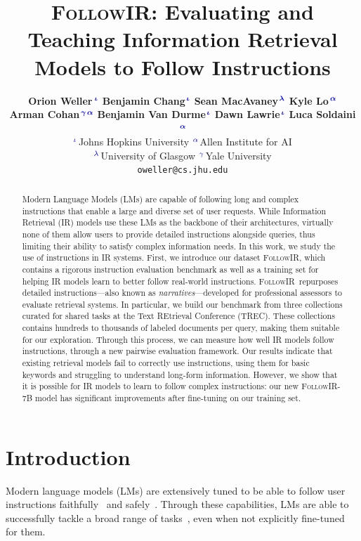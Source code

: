\documentclass{article} %
\author{
    \textbf{Orion Weller}$^{\hspace{.1em}
    \hspace{.1em}{\color{blue}\boldsymbol{\iota}}}$
    \quad
    \textbf{Benjamin Chang}$^{\hspace{.1em}\color{blue}\boldsymbol{\iota}}$
    \quad
    \textbf{Sean MacAvaney}$^{\hspace{.1em}\color{blue}\boldsymbol{\lambda}}$
    \quad
    \vspace{.2em}
    \textbf{Kyle Lo}$^{\hspace{.1em}\color{blue}\boldsymbol{\alpha}}$
    \quad \\
    \textbf{Arman Cohan}$^{\hspace{.1em}\color{blue}\boldsymbol{\gamma\hspace{.1em}\alpha}}$
    \quad
    \textbf{Benjamin Van Durme}$^{\hspace{.1em}\color{blue}\boldsymbol{\iota}}$
    \quad
    \textbf{Dawn Lawrie}$^{\hspace{.1em}\color{blue}\boldsymbol{\iota}}$
    \quad
    \textbf{Luca Soldaini}$^{\hspace{.1em}\color{blue}\boldsymbol{\alpha}}$
    \vspace{.5em}\\
    $^{\color{blue}\iota\hspace{.1em}}$Johns Hopkins University
    \quad
    $^{\color{blue}\alpha\hspace{.1em}}$Allen Institute for AI
     \vspace{.5em}\\
    $^{\color{blue}\lambda\hspace{.1em}}$University of Glasgow
        \quad
    $^{\color{blue}\gamma\hspace{.1em}}$Yale University
    \vspace{.5em}\\
    \texttt{oweller@cs.jhu.edu}
}
\begin{document}
\newcommand{\dataset}{\textsc{FollowIR}}

\title{\dataset: Evaluating and Teaching Information Retrieval Models to Follow Instructions}
\maketitle




\begin{abstract}
Modern Language Models (LMs) are capable of following long and complex instructions that enable 
a large and diverse set of user requests.
While Information Retrieval (IR) models use these LMs as the backbone of their architectures, 
virtually none of them allow users to provide detailed instructions alongside queries, thus limiting their ability to satisfy complex information needs.
In this work, we study the use of instructions in IR systems. 
First, we introduce our dataset \dataset, which contains a rigorous instruction evaluation benchmark as well as a training set for helping IR models learn to better follow real-world instructions.
\dataset\ repurposes detailed instructions---also known as \textit{narratives}---developed for professional assessors to evaluate retrieval systems.
In particular, we build our benchmark from three collections curated for  shared tasks at the Text REtrieval Conference (TREC).
These collections contains hundreds to thousands of labeled documents per query, making them suitable for our exploration.
Through this process, we can measure how well IR models follow instructions, through a new pairwise evaluation framework.
Our results indicate that existing retrieval models fail to correctly use instructions, using them for basic keywords and struggling to understand long-form information.
However, we show that it is possible for IR models to learn to follow complex instructions: our new \dataset-7B model has significant improvements after fine-tuning on our training set.
\end{abstract}









\section{Introduction}
Modern language models (LMs) are extensively tuned to be able to follow user instructions faithfully~\citep{chung2022scaling,instructGPT,dpo,wang2023far,ivison2023camels} and safely~\citep{anthropic-hh,bianchi2024safetytuned}.
Through these capabilities, LMs are able to successfully tackle a broad range of tasks~\citep{chiang2024chatbot,liang2023holistic,gpt4tools,jimenez2024swebench,zeng2023evaluating}, even when not explicitly fine-tuned for them.
\end{document}
